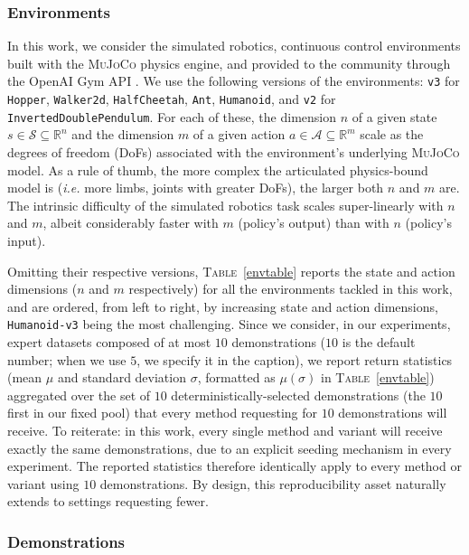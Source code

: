 \subsubsection{Environments}

In this work, we consider the simulated robotics, continuous control environments
built with the \textsc{MuJoCo} \cite{Todorov2012-gc} physics engine,
and provided to the community through the OpenAI Gym API \cite{Brockman2016-un}.
We use the following versions of the environments: \texttt{v3} for
\texttt{Hopper}, \texttt{Walker2d},
\texttt{HalfCheetah}, \texttt{Ant}, \texttt{Humanoid},
and \texttt{v2} for \texttt{InvertedDoublePendulum}.
For each of these, the dimension $n$ of a given state $s \in \mathcal{S} \subseteq \mathbb{R}^n$
and the dimension $m$ of a given action $a \in \mathcal{A} \subseteq \mathbb{R}^m$
scale as the degrees of freedom (DoFs) associated with the environment's underlying
\textsc{MuJoCo} model.
As a rule of thumb, the more complex the articulated physics-bound model is
(\textit{i.e.} more limbs, joints with greater DoFs),
the larger both $n$ and $m$ are.
The intrinsic difficulty of the simulated robotics task scales super-linearly with $n$ and $m$,
albeit considerably faster with $m$ (policy's output) than with $n$ (policy's input).

Omitting their respective versions, \textsc{Table}~\ref{envtable} reports the
state and action dimensions ($n$ and $m$ respectively) for all the environments tackled
in this work, and are ordered, from left to right, by increasing
state and action dimensions, \texttt{Humanoid-v3} being the most challenging.
Since we consider, in our experiments, expert datasets composed of at most $10$ demonstrations
($10$ is the default number; when we use $5$, we specify it in the caption),
we report return statistics (mean $\mu$ and standard deviation $\sigma$,
formatted as $\mu(\sigma)$ in \textsc{Table}~\ref{envtable}) aggregated over
the set of $10$ deterministically-selected demonstrations (the $10$ first in our fixed pool)
that every method requesting for $10$ demonstrations will receive.
To reiterate: in this work, every single method and variant will receive exactly the same
demonstrations, due to an explicit seeding mechanism in every experiment.
The reported statistics therefore identically apply to every method or variant using
$10$ demonstrations.
By design, this reproducibility asset naturally extends to settings
requesting fewer.

\subsubsection{Demonstrations}

